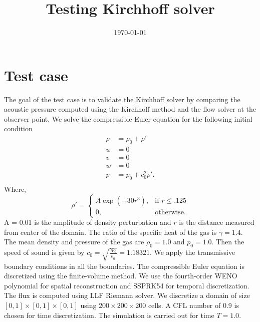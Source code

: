 \documentclass[a4paper]{article}
\title{Testing Kirchhoff solver}
\date{\today}
\begin{document}
\maketitle
\section{Test case}

The goal of the test case is to validate the Kirchhoff solver by comparing the acoustic pressure computed using the Kirchhoff method and the flow solver at the observer point. We solve the compressible Euler equation for the following initial condition
\begin{align*}
    \rho &= \rho_{0} + \rho'\\
    u    &= 0\\
    v    &= 0\\
    w    &= 0\\
    p    &= p_{0} + c_{0}^{2}\rho'.\\ 
\end{align*}
Where, 
\[
    \rho'= 
\begin{cases}
    A \exp({-30r^{3}}),& \text{if } r\leq .125\\
    0,              & \text{otherwise}.
\end{cases}
\]A = 0.01 is the amplitude of density perturbation and $r$ is the distance measured from center of the domain. 
The ratio of the specific heat of the gas is $\gamma = 1.4$. The mean density and pressure of the gas are $\rho_{0} = 1.0$ and $p_{0} = 1.0$. 
Then the speed of sound is given by $c_{0}= \sqrt{\frac{\gamma p_{0}}{\rho_{0}}} = 1.18321$.
We apply the transmissive boundary conditions in all the boundaries.
The compressible Euler equation is discretized using the finite-volume method. 
We use the fourth-order WENO polynomial for spatial reconstruction
and SSPRK54 for temporal discretization. The flux is computed using LLF Riemann solver.
We discretize a domain of size $[0, 1] \times [0, 1] \times [0, 1]$  using $200 \times 200 \times 200$ cells. A CFL number of 0.9 is chosen for time discretization. The simulation is carried out for time $T = 1.0$.
\end{document}
